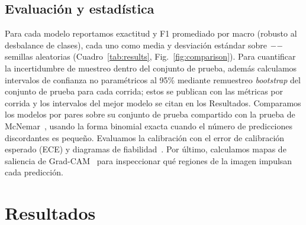 \documentclass[10pt]{article}
\begin{document}
\subsection{Evaluación y estadística}
Para cada modelo reportamos exactitud y F1 promediado por macro (robusto al desbalance
de clases), cada uno como media y desviación estándar sobre $--$ semillas
aleatorias (Cuadro~\ref{tab:results}, Fig.~\ref{fig:comparison}). Para cuantificar la
incertidumbre de muestreo dentro del conjunto de prueba, además calculamos intervalos
de confianza no paramétricos al 95\% mediante remuestreo \emph{bootstrap} del conjunto
de prueba para cada corrida; estos se publican con las métricas por corrida y los
intervalos del mejor modelo se citan en los Resultados. Comparamos los modelos por
pares sobre su conjunto de prueba compartido con la prueba de
McNemar~\cite{dietterich1998mcnemar}, usando la forma binomial exacta cuando el número
de predicciones discordantes es pequeño. Evaluamos la calibración con el error de
calibración esperado (ECE) y diagramas de fiabilidad~\cite{guo2017calibration}. Por
último, calculamos mapas de saliencia de Grad-CAM~\cite{selvaraju2017gradcam} para
inspeccionar qué regiones de la imagen impulsan cada predicción.

\section{Resultados}
\end{document}
